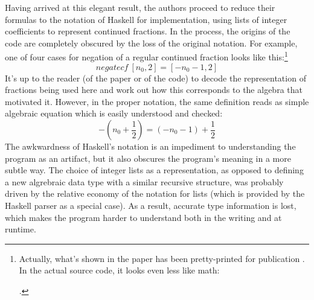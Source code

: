 Having arrived at this elegant result, the authors proceed to reduce their formulas to the notation of Haskell for implementation, using lists of integer coefficients to represent continued fractions. In the process, the origins of the code are completely obscured by the loss of the original notation. For example, one of four cases for negation of a regular continued fraction looks like this:\footnote{Actually, what's shown in the paper has been pretty-printed for publication \cite{lhs2tex}. In the actual source code, it looks even less like math: 

\centering {}.}
$$\mathit{negatecf}\:[n_0, 2] = [-n_0-1, 2]$$
It's up to the reader (of the paper or of the code) to decode the representation of fractions being used here and work out how this corresponds to the algebra that motivated it. However, in the proper notation, the same definition reads as simple algebraic equation which is easily understood and checked:
$$-\left(n_0 + \frac{1}{2}\right) = (-n_0 - 1) + \frac{1}{2}$$
The awkwardness of Haskell's notation is an impediment to understanding the program as an artifact, but it also obscures the program's meaning in a more subtle way. The choice of integer lists as a representation, as opposed to defining a new algrebraic data type with a similar recursive structure, was probably driven by the relative economy of the notation for lists (which is provided by the Haskell parser as a special case). As a result, accurate type information is lost, which makes the program harder to understand both in the writing and at runtime.


